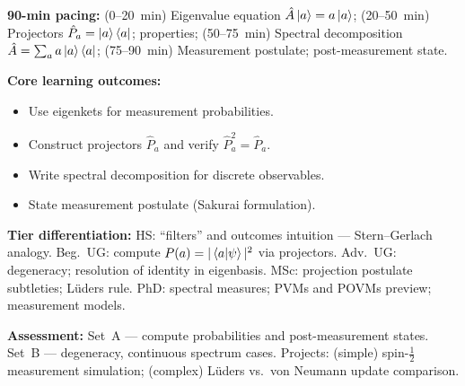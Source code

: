 \documentclass[11pt,a4paper]{article}
\begin{document}
\medskip
\begin{tcolorbox}[modulebox, title={Module~I.2 --- Lecture L04: Eigenkets, Projectors \& Spectral Decomposition}]
\textbf{90-min pacing:} (0--20~min) Eigenvalue equation $\hat{A}\ket{a}=a\ket{a}$;
(20--50~min) Projectors $\hat{P}_a=\ket{a}\bra{a}$; properties;
(50--75~min) Spectral decomposition $\hat{A}=\sum_a a\ket{a}\bra{a}$;
(75--90~min) Measurement postulate; post-measurement state.

\medskip\textbf{Core learning outcomes:}
\begin{itemize}[leftmargin=1.4em,topsep=2pt,itemsep=1pt]
  \item Use eigenkets for measurement probabilities.
  \item Construct projectors $\hat{P}_a$ and verify $\hat{P}_a^2=\hat{P}_a$.
  \item Write spectral decomposition for discrete observables.
  \item State measurement postulate (Sakurai formulation).
\end{itemize}

\medskip\textbf{Tier differentiation:}
HS: ``filters'' and outcomes intuition --- Stern--Gerlach analogy.
Beg.\ UG: compute $P(a)=|\braket{a|\psi}|^2$ via projectors.
Adv.\ UG: degeneracy; resolution of identity in eigenbasis.
MSc: projection postulate subtleties; L\"uders rule.
PhD: spectral measures; PVMs and POVMs preview; measurement models.

\medskip\textbf{Assessment:}
Set~A --- compute probabilities and post-measurement states.
Set~B --- degeneracy, continuous spectrum cases.
Projects: (simple) spin-$\tfrac{1}{2}$ measurement simulation; (complex) L\"uders vs.\ von Neumann update comparison.
\end{tcolorbox}
\end{document}
